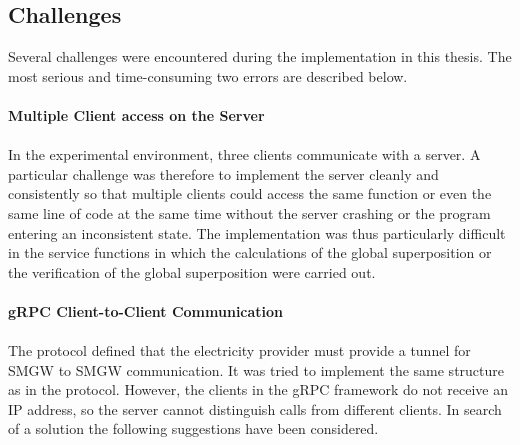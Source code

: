 \subsection{Challenges}
Several challenges were encountered during the implementation in this thesis. The most serious and time-consuming two errors are described below.\\
\\
\textbf{Multiple Client access on the Server}
\\
\\ 
In the experimental environment, three clients communicate with a server. A particular challenge was therefore to implement the server cleanly and consistently so that multiple clients could access the same function or even the same line of code at the same time without the server crashing or the program entering an inconsistent state. The implementation was thus particularly difficult in the service functions in which the calculations of the global superposition or the verification of the global superposition were carried out.%
\\
\\
\textbf{gRPC Client-to-Client Communication}
\\
\\
The protocol defined that the electricity provider must provide a tunnel for \gls{SMGW} to \gls{SMGW} communication. It was tried to implement the same structure as in the protocol. However, the clients in the gRPC framework do not receive an \gls{IP} address, so the server cannot distinguish calls from different clients. In search of a solution the following suggestions have been considered. 
